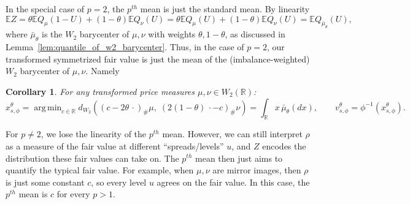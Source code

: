 \documentclass[11pt]{article}
\theoremstyle{plain}
\newtheorem{corollary}[theorem]{Corollary}
\theoremstyle{definition}
\numberwithin{equation}{section}
\newcommand{\E}{\mathbb{E}}
\DeclareMathOperator*{\argmin}{arg\,min}
\begin{document}
In the special case of $p=2$, the $p^{th}$ mean is just the standard mean. By linearity
%
\[\E Z = \theta \E Q_\mu(1-U) + (1-\theta) \E Q_\nu(U) = \theta \E Q_\mu(U) + (1-\theta) \E Q_\nu(U) =\E Q_{\bar{\mu}_\theta}(U), \]
%
\noindent where $\bar{\mu}_\theta$ is the $W_2$ barycenter of $\mu, \nu$ with weights $\theta, 1-\theta$, as discussed in
Lemma~\ref{lem:quantile_of_w2_barycenter}. Thus, in the case of $p=2$, our transformed symmetrized fair value is just the mean of the
(imbalance-weighted) $W_2$ barycenter of $\mu, \nu$. Namely
%
\begin{corollary} For any transformed price measures $\mu,\nu\in W_2(\mathbb R)$:
%
    \[x_{s,\phi}^\theta = \argmin_{c \in \mathbb R} d_{W_2}\left((c-2\theta\,\cdot)_\#\mu, \; (2(1-\theta)\,\cdot-c)_\#\nu\right)
    = \int_\mathbb R x\,\bar{\mu}_\theta(dx),
    \qquad v_{s,\phi}^\theta=\phi^{-1}(x_{s,\phi}^\theta).\]
    \label{corr:w2_fv_is_mean_barycenter}
\end{corollary}
%
For $p \neq 2$, we lose the linearity of the $p^{th}$ mean. However, we can still
interpret $\rho$ as a measure of the fair value at different ``spreads/levels'' $u$, and $Z$
encodes the distribution these fair values can take on. The $p^{th}$ mean then just aims to quantify
the typical fair value. For example, when $\mu, \nu$ are mirror
images, then $\rho$ is just some constant $c$, so every level $u$ agrees on the fair value. In this case,
the $p^{th}$ mean is $c$ for every $p>1$.
\end{document}
